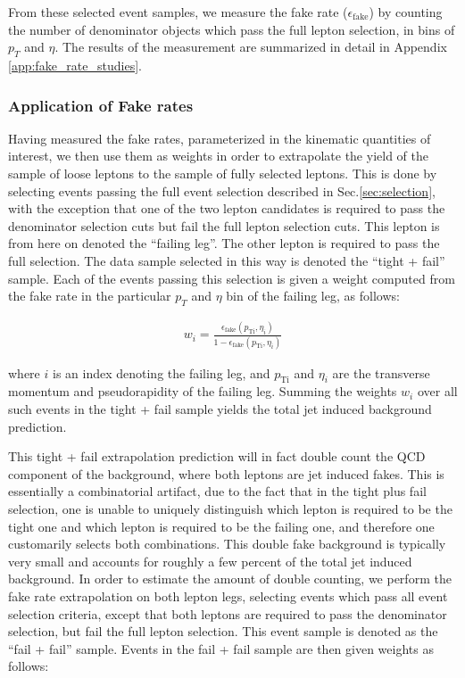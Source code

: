 From these selected event samples, we measure the fake rate 
($\epsilon_{\mathrm{fake}}$) by counting the number of denominator 
objects which pass the full lepton selection, in bins of $p_{T}$
and $\eta$. The results of the measurement are summarized in detail
in Appendix \ref{app:fake_rate_studies}.

\subsubsection{Application of Fake rates}
\label{sec:fakerateApplication}

Having measured the fake rates, parameterized in the kinematic quantities of interest,
we then use them as weights in order to extrapolate the yield of the sample of loose
leptons to the sample of fully selected leptons. This is done by selecting events
passing the full event selection described in Sec.\ref{sec:selection}, 
with the exception that one of the two lepton
candidates is required to pass the denominator selection cuts but fail the full 
lepton selection cuts. This lepton is from here on denoted the ``failing leg''. 
The other lepton is required to pass the full selection.
The data sample selected in this way is denoted the ``tight + fail'' sample.
Each of the events passing this selection is given a weight computed from
the fake rate in the particular $p_{T}$ and $\eta$ bin of the 
failing leg, as follows:

\begin{eqnarray}
  w_{i} = \frac{\epsilon_{\mathrm{fake}}(p_{\mathrm{T i}},\eta_{i})}{1 - \epsilon_{\mathrm{fake}}(p_{\mathrm{T i}},\eta_{i})}
\end{eqnarray}

where $i$ is an index denoting the failing leg, and $p_{\mathrm{T i}}$ and $\eta_{i}$
are the transverse momentum and pseudorapidity of the failing leg. 
Summing the weights $w_{i}$ over all such events in the tight + fail sample yields
the total jet induced background prediction.

This tight + fail extrapolation prediction will in fact 
double count the QCD component of the background, where both leptons are jet induced
fakes. This is essentially a combinatorial artifact, due to the fact that in the tight
plus fail selection, one is unable to uniquely distinguish which lepton is required to
be the tight one and which lepton is required to be the failing one, and therefore
one customarily selects both combinations. This double fake background is 
typically very small and accounts for roughly a few percent of the total jet
induced background. In order to estimate the amount of double counting,
we perform the fake rate extrapolation on both lepton legs, selecting events
which pass all event selection criteria, except that both leptons are required
to pass the denominator selection, but fail the full lepton selection. This
event sample is denoted as the ``fail + fail'' sample. Events in the fail + fail
sample are then given weights as follows:

